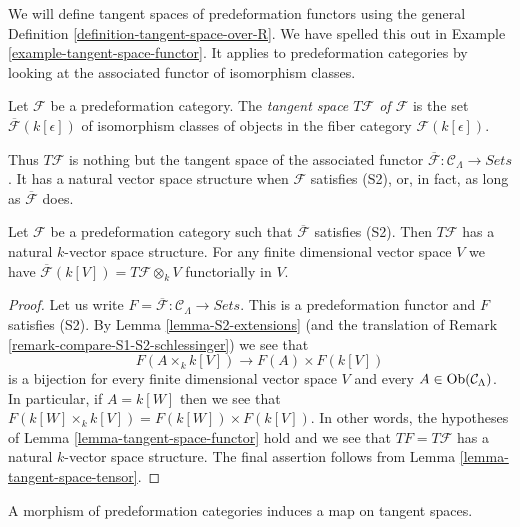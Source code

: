 \noindent
We will define tangent spaces of predeformation functors using the general
Definition \ref{definition-tangent-space-over-R}.
We have spelled this out in
Example \ref{example-tangent-space-functor}.
It applies to predeformation categories by looking at the associated
functor of isomorphism classes.

\begin{definition}
\label{definition-tangent-space}
Let $\mathcal{F}$ be a predeformation category.
The {\it tangent space $T \mathcal{F}$ of $\mathcal{F}$}
is the set $\overline{\mathcal{F}}(k[\epsilon])$
of isomorphism classes of objects in the fiber category $\mathcal
F(k[\epsilon])$.
\end{definition}

\noindent
Thus $T \mathcal{F}$ is nothing but the tangent space of the associated
functor $\overline{\mathcal{F}}: \mathcal{C}_\Lambda \to \textit{Sets}$.
It has a natural vector space structure when $\mathcal{F}$ satisfies (S2),
or, in fact, as long as $\overline{\mathcal{F}}$ does.

\begin{lemma}
\label{lemma-tangent-space-vector-space}
Let $\mathcal{F}$ be a predeformation category such that
$\overline{\mathcal{F}}$ satisfies (S2). Then $T \mathcal{F}$ has a
natural $k$-vector space structure. For any finite dimensional
vector space $V$ we have
$\overline{\mathcal{F}}(k[V]) = T\mathcal{F} \otimes_k V$
functorially in $V$.
\end{lemma}

\begin{proof}
Let us write
$F = \overline{\mathcal{F}} : \mathcal{C}_\Lambda \to \textit{Sets}$.
This is a predeformation functor and $F$ satisfies (S2). By
Lemma \ref{lemma-S2-extensions}
(and the translation of
Remark \ref{remark-compare-S1-S2-schlessinger})
we see that
$$
F(A \times_k k[V]) \longrightarrow F(A) \times F(k[V])
$$
is a bijection for every finite dimensional vector space $V$ and every
$A \in \mathop{\rm Ob}\nolimits(\mathcal{C}_\Lambda)$. In particular, if $A = k[W]$
then we see that $F(k[W] \times_k k[V]) = F(k[W]) \times F(k[V])$.
In other words, the hypotheses of
Lemma \ref{lemma-tangent-space-functor}
hold and we see that $TF = T \mathcal{F}$
has a natural $k$-vector space structure.
The final assertion follows from
Lemma \ref{lemma-tangent-space-tensor}.
\end{proof}

\noindent
A morphism of predeformation categories induces a map on tangent spaces.

